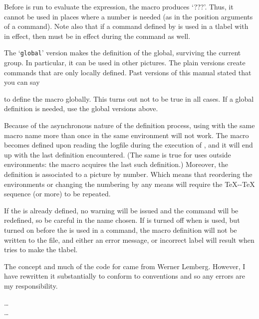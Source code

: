 \documentclass[letterpaper]{article}
\begin{document}
Before \MF{} is run to evaluate the expression, the macro produces
`???'. Thus, it cannot be used in places where a number is needed (as in
the position arguments of a  command). Note also that if a
command defined by  is used in a tlabel with
 in effect, then  must be in effect during
the  command as well.

The `\texttt{global}' version makes the definition of the
 global, surviving the current group. In particular,
it can be used in other pictures. The plain versions create commands
that are only locally defined. Past versions of this manual stated that
you can say
\begin{display}
\end{display}
to define the macro globally. This turns out not to be true in all
cases. If a global definition is needed, use the global versions above.

Because of the asynchronous nature of the definition process, using
 with the same macro name more than once in the same
 environment will not work. The macro becomes defined
upon reading the logfile during the execution of ,
and it will end up with the last definition encountered. (The same is
true for uses outside  environments: the macro acquires the
last such definition.)  Moreover, the definition is associated to a
picture by number. Which means that reordering the environments or
changing the numbering by any means will require the \TeX{}-\MF{}-\TeX{}
sequence (or more) to be repeated.

If the  is already defined, no warning will be issued
and the command will be redefined, so be careful in the name chosen.
If  is turned off when  is used, but
turned on before the  is used in a 
command, the macro definition will not be written to the 
file, and either an error message, or incorrect label will result
when \MP{} tries to make the tlabel.

The concept and much of the code for  came from Werner
Lemberg. However, I have rewritten it substantially to conform to \mfp{}
conventions and so any errors are my responsibility.

\begin{cd}
\dots\\
\dots\\
%
%
\end{cd}
\end{document}
